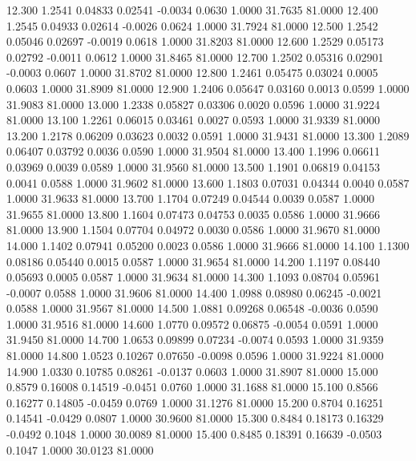   12.300   1.2541   0.04833   0.02541  -0.0034   0.0630   1.0000  31.7635  81.0000
  12.400   1.2545   0.04933   0.02614  -0.0026   0.0624   1.0000  31.7924  81.0000
  12.500   1.2542   0.05046   0.02697  -0.0019   0.0618   1.0000  31.8203  81.0000
  12.600   1.2529   0.05173   0.02792  -0.0011   0.0612   1.0000  31.8465  81.0000
  12.700   1.2502   0.05316   0.02901  -0.0003   0.0607   1.0000  31.8702  81.0000
  12.800   1.2461   0.05475   0.03024   0.0005   0.0603   1.0000  31.8909  81.0000
  12.900   1.2406   0.05647   0.03160   0.0013   0.0599   1.0000  31.9083  81.0000
  13.000   1.2338   0.05827   0.03306   0.0020   0.0596   1.0000  31.9224  81.0000
  13.100   1.2261   0.06015   0.03461   0.0027   0.0593   1.0000  31.9339  81.0000
  13.200   1.2178   0.06209   0.03623   0.0032   0.0591   1.0000  31.9431  81.0000
  13.300   1.2089   0.06407   0.03792   0.0036   0.0590   1.0000  31.9504  81.0000
  13.400   1.1996   0.06611   0.03969   0.0039   0.0589   1.0000  31.9560  81.0000
  13.500   1.1901   0.06819   0.04153   0.0041   0.0588   1.0000  31.9602  81.0000
  13.600   1.1803   0.07031   0.04344   0.0040   0.0587   1.0000  31.9633  81.0000
  13.700   1.1704   0.07249   0.04544   0.0039   0.0587   1.0000  31.9655  81.0000
  13.800   1.1604   0.07473   0.04753   0.0035   0.0586   1.0000  31.9666  81.0000
  13.900   1.1504   0.07704   0.04972   0.0030   0.0586   1.0000  31.9670  81.0000
  14.000   1.1402   0.07941   0.05200   0.0023   0.0586   1.0000  31.9666  81.0000
  14.100   1.1300   0.08186   0.05440   0.0015   0.0587   1.0000  31.9654  81.0000
  14.200   1.1197   0.08440   0.05693   0.0005   0.0587   1.0000  31.9634  81.0000
  14.300   1.1093   0.08704   0.05961  -0.0007   0.0588   1.0000  31.9606  81.0000
  14.400   1.0988   0.08980   0.06245  -0.0021   0.0588   1.0000  31.9567  81.0000
  14.500   1.0881   0.09268   0.06548  -0.0036   0.0590   1.0000  31.9516  81.0000
  14.600   1.0770   0.09572   0.06875  -0.0054   0.0591   1.0000  31.9450  81.0000
  14.700   1.0653   0.09899   0.07234  -0.0074   0.0593   1.0000  31.9359  81.0000
  14.800   1.0523   0.10267   0.07650  -0.0098   0.0596   1.0000  31.9224  81.0000
  14.900   1.0330   0.10785   0.08261  -0.0137   0.0603   1.0000  31.8907  81.0000
  15.000   0.8579   0.16008   0.14519  -0.0451   0.0760   1.0000  31.1688  81.0000
  15.100   0.8566   0.16277   0.14805  -0.0459   0.0769   1.0000  31.1276  81.0000
  15.200   0.8704   0.16251   0.14541  -0.0429   0.0807   1.0000  30.9600  81.0000
  15.300   0.8484   0.18173   0.16329  -0.0492   0.1048   1.0000  30.0089  81.0000
  15.400   0.8485   0.18391   0.16639  -0.0503   0.1047   1.0000  30.0123  81.0000
